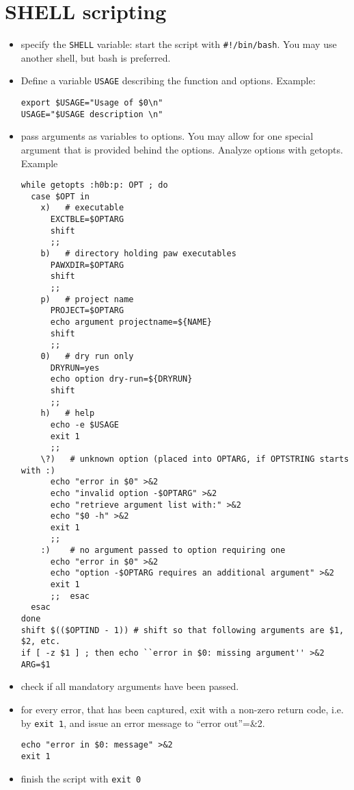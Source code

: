 \documentclass[11pt,a4paper]{report}
\begin{document}
\section{SHELL scripting}
\cite{1}
\begin{itemize}
\item specify the \verb|SHELL| variable: start the script with
  \verb|#!/bin/bash|. You may use another shell, but bash is
  preferred.
%
\item Define a variable \verb|USAGE| describing the function and
  options. Example:
\begin{verbatim}
export $USAGE="Usage of $0\n"
USAGE="$USAGE description \n"
\end{verbatim}
%
\item pass arguments as variables to options. You may allow for one
  special argument that is provided behind the options. Analyze
  options with getopts. Example
\begin{verbatim}
while getopts :h0b:p: OPT ; do
  case $OPT in
    x)   # executable
      EXCTBLE=$OPTARG
      shift
      ;; 
    b)   # directory holding paw executables
      PAWXDIR=$OPTARG  
      shift
      ;; 
    p)   # project name
      PROJECT=$OPTARG
      echo argument projectname=${NAME}
      shift
      ;;
    0)   # dry run only
      DRYRUN=yes
      echo option dry-run=${DRYRUN}
      shift
      ;;
    h)   # help
      echo -e $USAGE
      exit 1
      ;;
    \?)   # unknown option (placed into OPTARG, if OPTSTRING starts with :)
      echo "error in $0" >&2
      echo "invalid option -$OPTARG" >&2
      echo "retrieve argument list with:" >&2
      echo "$0 -h" >&2
      exit 1
      ;;
    :)    # no argument passed to option requiring one
      echo "error in $0" >&2
      echo "option -$OPTARG requires an additional argument" >&2
      exit 1
      ;;  esac
  esac
done
shift $(($OPTIND - 1)) # shift so that following arguments are $1, $2, etc.
if [ -z $1 ] ; then echo ``error in $0: missing argument'' >&2
ARG=$1
\end{verbatim}
% 
\item check if all mandatory arguments have been passed.
%
\item for every error, that has been captured, exit with a non-zero
  return code, i.e. by \verb|exit 1|, and issue an error message to
  ``error out''=\&2.
\begin{verbatim}
echo "error in $0: message" >&2
exit 1
\end{verbatim}
%
\item finish the script with \verb|exit 0|
\end{itemize}
\end{document}
